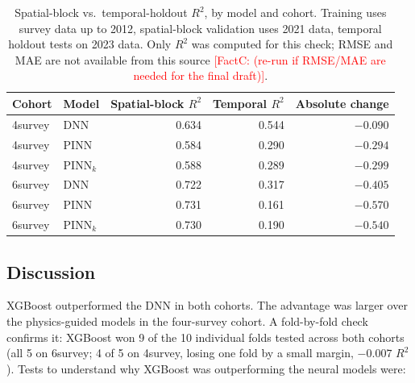 \documentclass[logo,msc,ai]{infthesis}           %
\newcommand{\fc}[1]{\textcolor{red}{[FactC: #1]}}
\begin{document}
\begin{table}[!htbp]
\centering
\small
\renewcommand{\arraystretch}{1.2}
\setlength{\tabcolsep}{4pt}
\begin{tabular}{llrrr}
\toprule
Cohort & Model & Spatial-block $R^2$ & Temporal $R^2$ & Absolute change \\
\midrule
4survey & DNN & 0.634 & 0.544 & $-0.090$ \\
4survey & PINN & 0.584 & 0.290 & $-0.294$ \\
4survey & PINN$_k$ & 0.588 & 0.289 & $-0.299$ \\
6survey & DNN & 0.722 & 0.317 & $-0.405$ \\
6survey & PINN & 0.731 & 0.161 & $-0.570$ \\
6survey & PINN$_k$ & 0.730 & 0.190 & $-0.540$ \\
\bottomrule
\end{tabular}
\caption{Spatial-block vs.\ temporal-holdout $R^2$, by model and cohort. Training uses survey data
up to 2012, spatial-block validation uses 2021 data, temporal holdout tests on 2023 data. Only
$R^2$ was computed for this check; RMSE and MAE are not available from this source
\fc{(re-run if RMSE/MAE are needed for the final draft)}.}
\label{tab:results-rq1-temporal}
\end{table}

\subsection{Discussion}
XGBoost outperformed the DNN in both cohorts. The advantage was larger over the physics-guided
models in the four-survey cohort. A fold-by-fold check confirms it: XGBoost won 9 of the 10 individual folds tested across both cohorts (all 5 on 6survey; 4 of 5 on 4survey, losing one fold by a small margin, $-0.007$ $R^2$). Tests to understand why XGBoost was outperforming the neural models were: 
\end{document}
